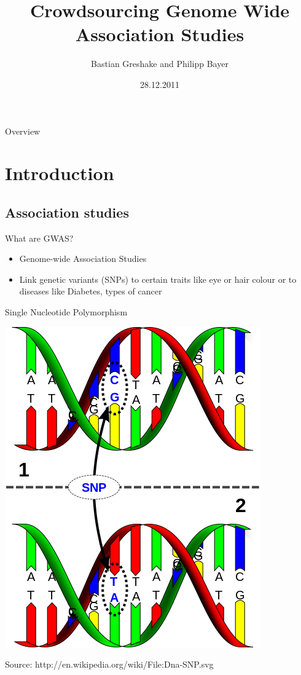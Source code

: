 \documentclass[12pt,a4paper]{beamer}
\title[Open-GWAS]{Crowdsourcing Genome Wide Association Studies}%
\date{28.12.2011}
\author{Bastian Greshake and Philipp Bayer}
\begin{document}
\begin{frame}
\titlepage
\end{frame}

\begin{frame}{Overview}
\tableofcontents
\end{frame}

\section{Introduction}
\subsection{Association studies}

\begin{frame}{What are GWAS?}
\begin{itemize}
\item Genome-wide Association Studies
\pause \item Link genetic variants (SNPs) to certain traits like eye or hair colour or to diseases like Diabetes, types of cancer
\end{itemize}
\end{frame}

\begin{frame}{Single Nucleotide Polymorphism}
\begin{center}
\includegraphics[scale=0.4]{SNP.png} \\
\begin{tiny}Source: http://en.wikipedia.org/wiki/File:Dna-SNP.svg\end{tiny}
\end{center}
\end{frame}
\end{document}
